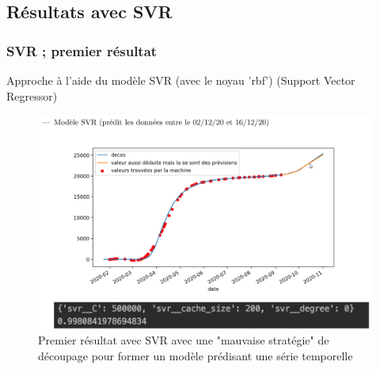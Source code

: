 \documentclass{beamer}
\begin{document}
\subsection{Résultats avec SVR}
\begin{frame}
	\frametitle{SVR ; premier résultat}
	Approche à l'aide du modèle SVR (avec le noyau 'rbf') (Support Vector Regressor)
	\begin{figure}[tc]
		\includegraphics[scale=0.2]{SVR_premierdecoup}
		\centering
		\caption{Premier résultat avec SVR avec une "mauvaise stratégie" de découpage pour former un modèle prédisant une série temporelle}
	\end{figure}
\end{frame}
\end{document}
